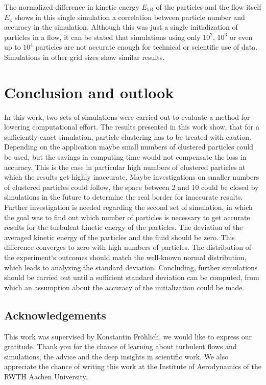 \documentclass[11pt,a4paper,openany,oneside,parskip=half*]{article}
\begin{document}
The normalized difference in kinetic energy $E_\mathrm{kB}$ of the particles and the flow itself $E_\mathrm{k}$ shows in this single simulation a correlation between particle number and accuracy in the simulation. Although this was just a single initialization of particles in a flow, it can be stated that simulations using only $10^2$, $10^3$ or even up to $10^4$ particles are not accurate enough for technical or scientific use of data. Simulations in other grid sizes show similar results.
\pagebreak
\section{Conclusion and outlook}
In this work, two sets of simulations were carried out to evaluate a method for lowering computational effort. 
\newline
The results presented in this work show, that for a sufficiently exact simulation, particle clustering has to be treated with caution. Depending on the application maybe small numbers of clustered particles could be used, but the savings in computing time would not compensate the loss in accuracy. This is the case in particular high numbers of clustered particles at which the results get highly inaccurate. Maybe investigations on smaller numbers of clustered particles could follow, the space between 2 and 10 could be closed by simulations in the future to determine the real border for inaccurate results. 
\newline
Further investigation is needed regarding the second set of simulation, in which the goal was to find out which number of particles is necessary to get accurate results for the turbulent kinetic energy of the particles. The deviation of the averaged kinetic energy of the particles and the fluid should be zero. This difference converges to zero with high numbers of particles. The distribution of the experiment`s outcomes should match the well-known normal distribution, which leads to analyzing the standard deviation. Concluding, further simulations should be carried out until a sufficient standard deviation can be computed, from which an assumption about the accuracy of the initialization could be made.
\subsection*{Acknowledgements}
This work was supervised by Konstantin Fr\"ohlich, we would like to express our gratitude. Thank you for the chance of learning about turbulent flows and simulations, the advice and the deep insights in scientific work. We also appreciate the chance of writing this work at the Institute of Aerodynamics of the RWTH Aachen University.
\pagebreak
\end{document}
